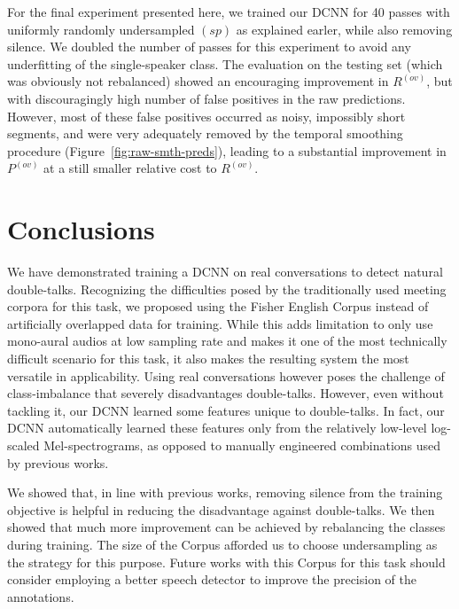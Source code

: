 \documentclass[a4paper]{article}
\begin{document}
For the final experiment presented here,
we trained our DCNN for 40 passes with uniformly randomly undersampled $(sp)$ as explained earler, while also removing silence.
We doubled the number of passes for this experiment to avoid any underfitting of the single-speaker class.
The evaluation on the testing set (which was obviously not rebalanced) showed an encouraging improvement in $R^{(ov)}$,
but with discouragingly high number of false positives in the raw predictions.
However, most of these false positives occurred as noisy, impossibly short segments,
and were very adequately removed by the temporal smoothing procedure (Figure~\ref{fig:raw-smth-preds}),
leading to a substantial improvement in $P^{(ov)}$ at a still smaller relative cost to $R^{(ov)}$.

\section{Conclusions}
We have demonstrated training a DCNN on real conversations to detect natural double-talks.
Recognizing the difficulties posed by the traditionally used meeting corpora for this task,
we proposed using the Fisher English Corpus instead of artificially overlapped data for training.
While this adds limitation to only use mono-aural audios at low sampling rate and makes it one of the most technically difficult scenario for this task,
it also makes the resulting system the most versatile in applicability.
Using real conversations however poses the challenge of class-imbalance that severely disadvantages double-talks.
However, even without tackling it, our DCNN learned some features unique to double-talks.
In fact, our DCNN automatically learned these features only from the relatively low-level log-scaled Mel-spectrograms,
as opposed to manually engineered combinations used by previous works.

We showed that, in line with previous works,
removing silence from the training objective is helpful in reducing the disadvantage against double-talks.
We then showed that much more improvement can be achieved by rebalancing the classes during training.
The size of the Corpus afforded us to choose undersampling as the strategy for this purpose.
Future works with this Corpus for this task should consider employing a better speech detector to improve the precision of the annotations.
\end{document}
